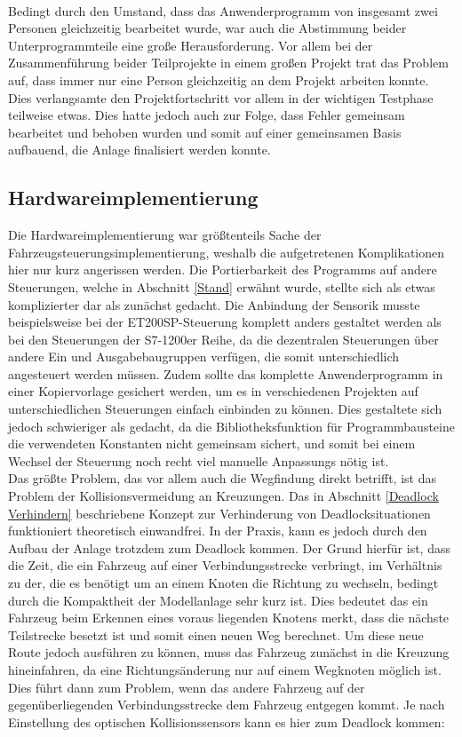 		\\[4pt]
		Bedingt durch den Umstand, dass das Anwenderprogramm von insgesamt zwei Personen gleichzeitig bearbeitet wurde, war auch die Abstimmung beider Unterprogrammteile eine große Herausforderung. Vor allem bei der Zusammenführung beider Teilprojekte in einem großen Projekt trat das Problem auf, dass immer nur eine Person gleichzeitig an dem Projekt arbeiten konnte. Dies verlangsamte den Projektfortschritt vor allem in der wichtigen Testphase teilweise etwas. Dies hatte jedoch auch zur Folge, dass Fehler gemeinsam bearbeitet und behoben wurden und somit auf einer gemeinsamen Basis aufbauend, die Anlage finalisiert werden konnte.
		
	\subsection{Hardwareimplementierung}
		\label{Probleme_Hardware}
		Die Hardwareimplementierung war größtenteils Sache der Fahrzeugsteuerungsimplementierung, weshalb die aufgetretenen Komplikationen hier nur kurz angerissen werden. Die Portierbarkeit des Programms auf andere Steuerungen, welche in Abschnitt \ref{Stand} erwähnt wurde, stellte sich als etwas komplizierter dar als zunächst gedacht. Die Anbindung der Sensorik musste beispielsweise bei der ET200SP-Steuerung komplett anders gestaltet werden als bei den Steuerungen der S7-1200er Reihe, da die dezentralen Steuerungen über andere Ein und Ausgabebaugruppen verfügen, die somit unterschiedlich angesteuert werden müssen. Zudem sollte das komplette Anwenderprogramm in einer Kopiervorlage gesichert werden, um es in verschiedenen Projekten auf unterschiedlichen Steuerungen einfach einbinden zu können. Dies gestaltete sich jedoch schwieriger als gedacht, da die Bibliotheksfunktion für Programmbausteine die verwendeten Konstanten nicht gemeinsam sichert, und somit bei einem Wechsel der Steuerung noch recht viel manuelle Anpassungs nötig ist.
		\\[4pt]
		Das größte Problem, das vor allem auch die Wegfindung direkt betrifft, ist das Problem der Kollisionsvermeidung an Kreuzungen. Das in Abschnitt \ref{Deadlock Verhindern} beschriebene Konzept zur Verhinderung von Deadlocksituationen funktioniert theoretisch einwandfrei. In der Praxis, kann es jedoch durch den Aufbau der Anlage trotzdem zum Deadlock kommen. Der Grund hierfür ist, dass die Zeit, die ein Fahrzeug auf einer Verbindungsstrecke verbringt, im Verhältnis zu der, die es benötigt um an einem Knoten die Richtung zu wechseln, bedingt durch die Kompaktheit der Modellanlage sehr kurz ist. Dies bedeutet das ein Fahrzeug beim Erkennen eines voraus liegenden Knotens merkt, dass die nächste Teilstrecke besetzt ist und somit einen neuen Weg berechnet. Um diese neue Route jedoch ausführen zu können, muss das Fahrzeug zunächst in die Kreuzung hineinfahren, da eine Richtungsänderung nur auf einem Wegknoten möglich ist. Dies führt dann zum Problem, wenn das andere Fahrzeug auf der gegenüberliegenden Verbindungsstrecke dem Fahrzeug entgegen kommt. Je nach Einstellung des optischen Kollisionssensors kann es hier zum Deadlock kommen:
		
